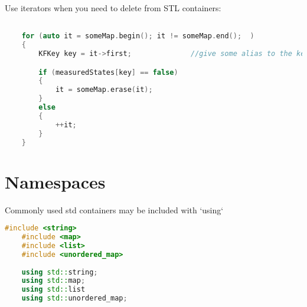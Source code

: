 Use iterators when you need to delete from STL containers:
\begin{lstlisting}[language=c++]

    for (auto it = someMap.begin(); it != someMap.end();  )
    {
        KFKey key = it->first;				//give some alias to the key/value so they're readable

        if (measuredStates[key] == false)
        {
	    	it = someMap.erase(it);
    	}
	    else
	    {
	    	++it;
    	}
    }
\end{lstlisting}
\section{Namespaces}

Commonly used std containers may be included with `using`
\begin{lstlisting}[language=c++]
    #include <string>
    #include <map>
    #include <list>
    #include <unordered_map>
    
    using std::string;
    using std::map;
    using std::list
    using std::unordered_map;
\end{lstlisting}